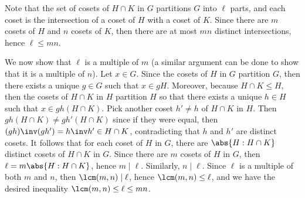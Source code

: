 \begin{problems}
\begin{sol}
        Note that the set of cosets of $H \cap K$ in $G$ partitions $G$ into $\ell$ parts, and each coset is the intersection of a coset of $H$ with a coset of $K$. Since there are $m$ cosets of $H$ and $n$ cosets of $K$, then there are at most $mn$ distinct intersections, hence $\ell \leq mn$. 

        We now show that $\ell$ is a multiple of $m$ (a similar argument can be done to show that it is a multiple of $n$). Let $x \in G$. Since the cosets of $H$ in $G$ partition $G$, then there exists a unique $g \in G$ such that $x \in gH$. Moreover, because $H \cap K \leq H$, then the cosets of $H \cap K$ in $H$ partition $H$ so that there exists a unique $h \in H$ such that $x \in gh(H \cap K)$. Pick another coset $h' \neq h$ of $H \cap K$ in $H$. Then $gh(H \cap K) \neq gh'(H \cap K)$ since if they were equal, then $(gh)\inv(gh') = h\inv h' \in H \cap K$, contradicting that $h$ and $h'$ are distinct cosets. It follows that for each coset of $H$ in $G$, there are $\abs{H : H \cap K}$ distinct cosets of $H \cap K$ in $G$. Since there are $m$ cosets of $H$ in $G$, then $\ell = m \abs{H : H \cap K}$, hence $m \mid \ell$. Similarly, $n \mid \ell$. Since $\ell$ is a multiple of both $m$ and $n$, then $\lcm(m, n) \mid \ell$, hence $\lcm(m, n) \leq \ell$, and we have the desired inequality $\lcm(m, n) \leq \ell \leq mn$.


\end{sol}
\end{problems}
